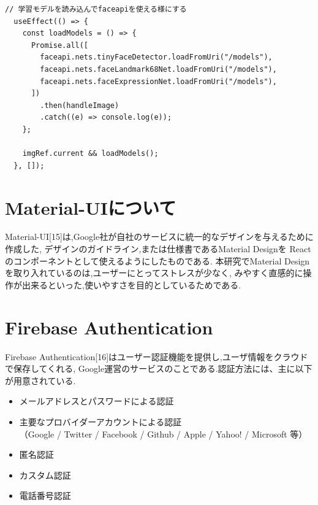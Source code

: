 \begin{lstlisting}[caption=表情分析]
  // 学習モデルを読み込んでfaceapiを使える様にする
  useEffect(() => {
    const loadModels = () => {
      Promise.all([
        faceapi.nets.tinyFaceDetector.loadFromUri("/models"),
        faceapi.nets.faceLandmark68Net.loadFromUri("/models"),
        faceapi.nets.faceExpressionNet.loadFromUri("/models"),
      ])
        .then(handleImage)
        .catch((e) => console.log(e));
    };

    imgRef.current && loadModels();
  }, []);
\end{lstlisting}
	
\section{Material-UIについて}
\label{sec:reference_material}
Material-UI[15]は,Google社が自社のサービスに統一的なデザインを与えるために作成した,
デザインのガイドライン,または仕様書であるMaterial Designを
Reactのコンポーネントとして使えるようにしたものである.
本研究でMaterial Designを取り入れているのは,ユーザーにとってストレスが少なく,
みやすく直感的に操作が出来るといった,使いやすさを目的としているためである.

\section{Firebase Authentication}
\label{sec:reference_auth}
Firebase Authentication[16]はユーザー認証機能を提供し,ユーザ情報をクラウドで保存してくれる,
Google運営のサービスのことである.認証方法には、主に以下が用意されている.

\begin{itemize}
	\item メールアドレスとパスワードによる認証 \\

	\item 主要なプロバイダーアカウントによる認証 \\
	（Google / Twitter / Facebook / Github / Apple / Yahoo! / Microsoft 等） \\

	\item 匿名認証 \\

	\item カスタム認証 \\

	\item 電話番号認証 \\
\end{itemize}

